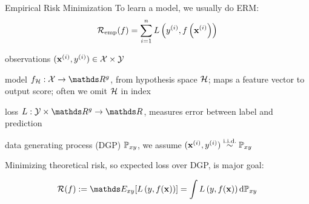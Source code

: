 \documentclass[11pt,compress,t,notes=noshow, xcolor=table]{beamer}
\begin{document}

\begin{frame}{Empirical Risk Minimization}
To learn a model, we usually do ERM:
$$\mathcal{R}_{\text{emp}}(f) = \sum\limits_{i=1}^n L\left(y^{(i)}, f\left(\mathbf{x}^{(i)}\right)\right)$$

\begin{itemizeM}[small]
\item observations $(\mathbf{x}^{(i)}, y^{(i)}) \in  \mathcal{X} \times \mathcal{Y}$
\item model $f_{\Hspace}:\Xspace \rightarrow \R^g$, 
from hypothesis space $\mathcal{H}$;
maps a feature vector to output score;
often we omit $\mathcal{H}$ in index 
\item loss $L:\Yspace\times\R^g\rightarrow\R$, measures error between label and prediction
\item data generating process (DGP) $\mathbb{P}_{xy}$, we assume %
$(\mathbf{x}^{(i)}, y^{(i)})  \overset{\text{i.i.d.}}{\sim} \mathbb{P}_{xy}$  
\end{itemizeM}

Minimizing theoretical risk, so expected loss over DGP, is major goal:

$$ \risk (f) := \E_{xy} [\Lxy] = \int \Lxy \text{d}\Pxy $$

\end{frame}
\end{document}
